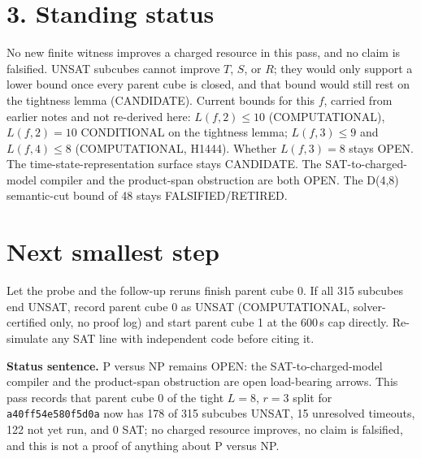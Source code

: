 \documentclass[11pt]{article}
\begin{document}
\section*{3. Standing status}
No new finite witness improves a charged resource in this pass, and no claim is falsified. UNSAT subcubes cannot improve $T$, $S$, or $R$; they would only support a lower bound once every parent cube is closed, and that bound would still rest on the tightness lemma (CANDIDATE). Current bounds for this $f$, carried from earlier notes and not re-derived here: $L(f,2)\le 10$ (COMPUTATIONAL), $L(f,2)=10$ CONDITIONAL on the tightness lemma; $L(f,3)\le 9$ and $L(f,4)\le 8$ (COMPUTATIONAL, H1444). Whether $L(f,3)=8$ stays OPEN. The time-state-representation surface stays CANDIDATE. The SAT-to-charged-model compiler and the product-span obstruction are both OPEN. The D(4,8) semantic-cut bound of 48 stays FALSIFIED/RETIRED.

\section*{Next smallest step}
Let the probe and the follow-up reruns finish parent cube 0. If all 315 subcubes end UNSAT, record parent cube 0 as UNSAT (COMPUTATIONAL, solver-certified only, no proof log) and start parent cube 1 at the 600\,s cap directly. Re-simulate any SAT line with independent code before citing it.

\bigskip
\noindent\textbf{Status sentence.} P versus NP remains OPEN: the SAT-to-charged-model compiler and the product-span obstruction are open load-bearing arrows. This pass records that parent cube 0 of the tight $L=8$, $r=3$ split for \texttt{a40ff54e580f5d0a} now has 178 of 315 subcubes UNSAT, 15 unresolved timeouts, 122 not yet run, and 0 SAT; no charged resource improves, no claim is falsified, and this is not a proof of anything about P versus NP.
\end{document}
